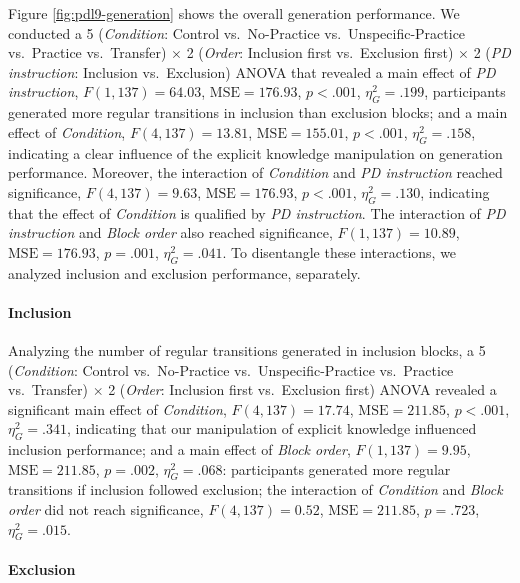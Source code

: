 \documentclass[man]{apa6}
\theoremstyle{definition}
\theoremstyle{definition}
\theoremstyle{definition}
\theoremstyle{remark}
\begin{document}
Figure \ref{fig:pdl9-generation} shows the overall generation
performance. We conducted a 5 (\emph{Condition}: Control vs.~No-Practice
vs.~Unspecific-Practice vs.~Practice vs.~Transfer) \(\times\) 2
(\emph{Order}: Inclusion first vs.~Exclusion first) \(\times\) 2
(\emph{PD instruction}: Inclusion vs.~Exclusion) ANOVA that revealed a
main effect of \emph{PD instruction}, \(F(1, 137) = 64.03\),
\(\mathrm{MSE} = 176.93\), \(p < .001\), \(\eta^2_G = .199\),
participants generated more regular transitions in inclusion than
exclusion blocks; and a main effect of \emph{Condition},
\(F(4, 137) = 13.81\), \(\mathrm{MSE} = 155.01\), \(p < .001\),
\(\eta^2_G = .158\), indicating a clear influence of the explicit
knowledge manipulation on generation performance. Moreover, the
interaction of \emph{Condition} and \emph{PD instruction} reached
significance, \(F(4, 137) = 9.63\), \(\mathrm{MSE} = 176.93\),
\(p < .001\), \(\eta^2_G = .130\), indicating that the effect of
\emph{Condition} is qualified by \emph{PD instruction}. The interaction
of \emph{PD instruction} and \emph{Block order} also reached
significance, \(F(1, 137) = 10.89\), \(\mathrm{MSE} = 176.93\),
\(p = .001\), \(\eta^2_G = .041\). To disentangle these interactions, we
analyzed inclusion and exclusion performance, separately.

\paragraph{Inclusion}\label{inclusion}

Analyzing the number of regular transitions generated in inclusion
blocks, a 5 (\emph{Condition}: Control vs.~No-Practice
vs.~Unspecific-Practice vs.~Practice vs.~Transfer) \(\times\) 2
(\emph{Order}: Inclusion first vs.~Exclusion first) ANOVA revealed a
significant main effect of \emph{Condition}, \(F(4, 137) = 17.74\),
\(\mathrm{MSE} = 211.85\), \(p < .001\), \(\eta^2_G = .341\), indicating
that our manipulation of explicit knowledge influenced inclusion
performance; and a main effect of \emph{Block order},
\(F(1, 137) = 9.95\), \(\mathrm{MSE} = 211.85\), \(p = .002\),
\(\eta^2_G = .068\): participants generated more regular transitions if
inclusion followed exclusion; the interaction of \emph{Condition} and
\emph{Block order} did not reach significance, \(F(4, 137) = 0.52\),
\(\mathrm{MSE} = 211.85\), \(p = .723\), \(\eta^2_G = .015\).

\paragraph{Exclusion}\label{exclusion}
\end{document}
